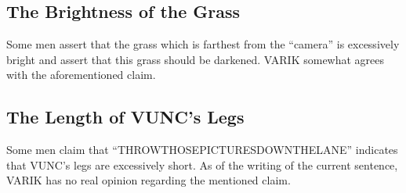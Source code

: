 \documentclass{report}
\begin{document}
\subsection{The Brightness of the Grass}
Some men assert that the grass which is farthest from the ``camera'' is excessively bright and assert that this grass should be darkened.  VARIK somewhat agrees with the aforementioned claim.

\subsection{The Length of VUNC's Legs}
Some men claim that ``THROWTHOSEPICTURESDOWNTHELANE'' indicates that VUNC's legs are excessively short.  As of the writing of the current sentence, VARIK has no real opinion regarding the mentioned claim.
\end{document}
